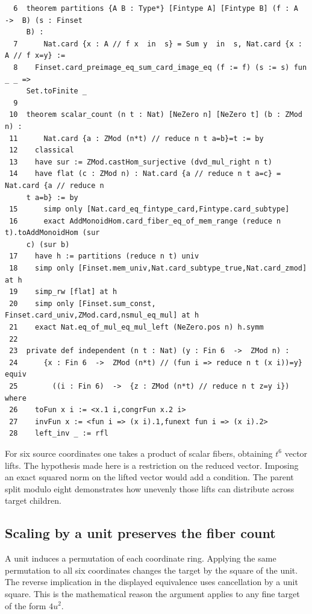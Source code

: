 \documentclass[12pt,letterpaper]{article}
\begin{document}
{\fontsize{9.2}{11.2}\selectfont\begin{verbatim}
  6  theorem partitions {A B : Type*} [Fintype A] [Fintype B] (f : A  ->  B) (s : Finset
     B) :
  7      Nat.card {x : A // f x  in  s} = Sum y  in  s, Nat.card {x : A // f x=y} :=
  8    Finset.card_preimage_eq_sum_card_image_eq (f := f) (s := s) fun _ _ =>
     Set.toFinite _
  9
 10  theorem scalar_count (n t : Nat) [NeZero n] [NeZero t] (b : ZMod n) :
 11      Nat.card {a : ZMod (n*t) // reduce n t a=b}=t := by
 12    classical
 13    have sur := ZMod.castHom_surjective (dvd_mul_right n t)
 14    have flat (c : ZMod n) : Nat.card {a // reduce n t a=c} = Nat.card {a // reduce n
     t a=b} := by
 15      simp only [Nat.card_eq_fintype_card,Fintype.card_subtype]
 16      exact AddMonoidHom.card_fiber_eq_of_mem_range (reduce n t).toAddMonoidHom (sur
     c) (sur b)
 17    have h := partitions (reduce n t) univ
 18    simp only [Finset.mem_univ,Nat.card_subtype_true,Nat.card_zmod] at h
 19    simp_rw [flat] at h
 20    simp only [Finset.sum_const, Finset.card_univ,ZMod.card,nsmul_eq_mul] at h
 21    exact Nat.eq_of_mul_eq_mul_left (NeZero.pos n) h.symm
 22
 23  private def independent (n t : Nat) (y : Fin 6  ->  ZMod n) :
 24      {x : Fin 6  ->  ZMod (n*t) // (fun i => reduce n t (x i))=y}  equiv
 25        ((i : Fin 6)  ->  {z : ZMod (n*t) // reduce n t z=y i}) where
 26    toFun x i := <x.1 i,congrFun x.2 i>
 27    invFun x := <fun i => (x i).1,funext fun i => (x i).2>
 28    left_inv _ := rfl
\end{verbatim}}
For six source coordinates one takes a product of scalar fibers, obtaining $t^6$ vector lifts. The hypothesis made here is a restriction on the reduced vector. Imposing an exact squared norm on the lifted vector would add a condition. The parent split modulo eight demonstrates how unevenly those lifts can distribute across target children.
\clearpage{}\subsection*{Scaling by a unit preserves the fiber count}\label{extract-FourLift31}
A unit induces a permutation of each coordinate ring. Applying the same permutation to all six coordinates changes the target by the square of the unit. The reverse implication in the displayed equivalence uses cancellation by a unit square. This is the mathematical reason the argument applies to any fine target of the form $4u^2$.
\par
\end{document}
